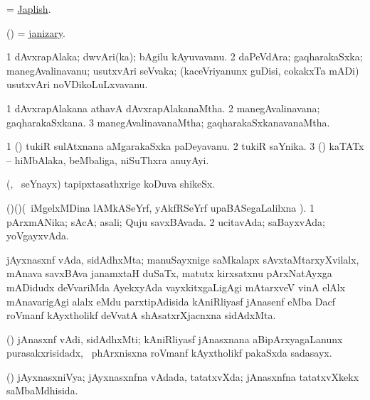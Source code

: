 \bentry
{}
\gl{\nA}
\bmng
=  \hyperlink{Japlish}{Japlish}. 
\emng
\eentry

\bentry
{}
\gl{\nA}
\bmng
(\ca) = \hyperlink{janizary}{janizary}. 
\emng
\eentry


\bentry
{}
\gl{\nA}
\bmng
\bnum
\num{1} dAvxrapAlaka; dwvAri(ka); bAgilu kAyuvavanu. 
\num{2} daPeVdAra; gaqharakaSxka; manegAvalinavanu; usutxvAri seVvaka; (kaceVriyanunx guDisi, cokakxTa mADi) usutxvAri noVDikoLuLxvavanu. 
\enum
\emng
\eentry

\bentry
{}
\gl{\gu}
\bmng
\bnum
\num{1} dAvxrapAlakana athavA dAvxrapAlakanaMtha. 
\num{2} manegAvalinavana; gaqharakaSxkana. 
\num{3} manegAvalinavanaMtha; gaqharakaSxkanavanaMtha. 
\enum
\emng
\eentry

\bentry
{}
\gl{\nA}
\bmng
\bnum
\num{1} (\ca) tukiR sulAtxnana aMgarakaSxka paDeyavanu. 
\num{2} tukiR saYnika. 
\num{3} (\rUpa) kaTATx -- hiMbAlaka, beMbaliga, niSuThxra anuyAyi. 
\enum
\emng
\eentry

\bentry
{}
\gl{\nA}
\bmng
(\ashi, \kanmu\ seYnayx) tapipxtasathxrige koDuva shikeSx. 
\emng
\eentry

\bentry
{}
\gl{\gu}
\bmng
(\birx)(\pArxM)(\kanmu\ iMgelxMDina lAMkASeYrf, yAkfRSeYrf upaBASegaLalilxna \parx). 
\bnum
\num{1} pArxmANika; sAcA; asali; Quju savxBAvada. 
\num{2} ucitavAda; saBayxvAda; yoVgayxvAda. 
\enum
\emng
\eentry

\bentry
{}
\gl{\nA}
\bmng
jAyxnasxnf vAda, sidAdhxMta; manuSayxnige saMkalapx sAvxtaMtarxyXvilalx, mAnava savxBAva janamxtaH duSaTx, matutx kirxsatxnu pArxNatAyxga mADidudx deVvariMda AyekxyAda vayxkitxgaLigAgi mAtarxveV vinA elAlx mAnavarigAgi alalx eMdu parxtipAdisida kAniRliyasf jAnasenf  eMba Dacf roVmanf kAyxtholikf deVvatA shAsatxrXjacnxna sidAdxMta. 
\emng
\eentry

\bentry
{}
\gl{\nA}
\bmng
(\ca) jAnasxnf vAdi, sidAdhxMti; kAniRliyasf jAnasxnana aBipArxyagaLanunx purasakxrisidadx, \kanmu\ phArxnisxna roVmanf kAyxtholikf pakaSxda sadasayx. 
\emng
\eentry

\bentry
{}
\gl{\gu}
\bmng
(\ca) jAyxnasxniVya; jAyxnasxnfna vAdada, tatatxvXda; jAnasxnfna tatatxvXkekx saMbaMdhisida. 
\emng
\eentry

